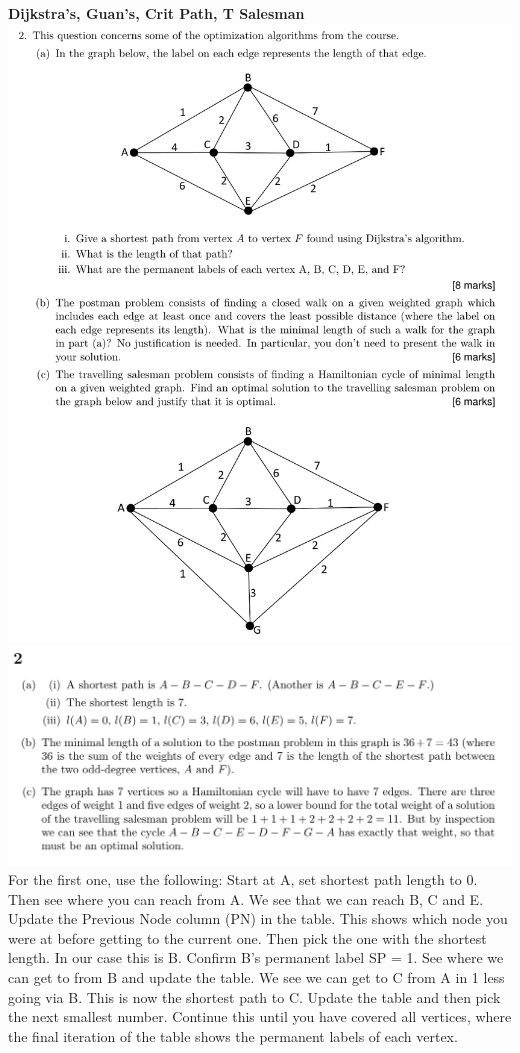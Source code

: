 \documentclass[10pt,landscape]{article}
\begin{document}
\begin{multicols}{2}
\newpage
\textbf{Dijkstra's, Guan's, Crit Path, T Salesman}
\includegraphics[width = 10 cm]{2023Q2.png}
\includegraphics[width = 10 cm]{2023A2.png}\\
For the first one, use the following:
Start at A, set shortest path length to 0. \\
Then see where you can reach from A. We see that we can reach B, C and E. Update the Previous Node column (PN) in the table. This shows which node you were at before getting to the current one. Then pick the one with the shortest length. In our case this is B. Confirm B's permanent label SP = 1. See where we can get to from B and update the table. We see we can get to C from A in 1 less going via B. This is now the shortest path to C. Update the table and then pick the next smallest number. Continue this until you have covered all vertices, where the final iteration of the table shows the permanent labels of each vertex.\\
\vspace{0.2cm}

\end{multicols}
\end{document}
